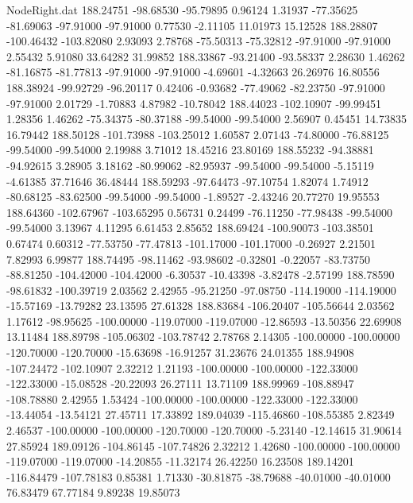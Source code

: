 \begin{filecontents}{NodeRight.dat}
 188.24751  -98.68530  -95.79895     0.96124    1.31937  -77.35625  -81.69063  -97.91000  -97.91000    0.77530   -2.11105   11.01973   15.12528
 188.28807 -100.46432 -103.82080     2.93093    2.78768  -75.50313  -75.32812  -97.91000  -97.91000    2.55432    5.91080   33.64282   31.99852
 188.33867  -93.21400  -93.58337     2.28630    1.46262  -81.16875  -81.77813  -97.91000  -97.91000   -4.69601   -4.32663   26.26976   16.80556
 188.38924  -99.92729  -96.20117     0.42406   -0.93682  -77.49062  -82.23750  -97.91000  -97.91000    2.01729   -1.70883    4.87982  -10.78042
 188.44023 -102.10907  -99.99451     1.28356    1.46262  -75.34375  -80.37188  -99.54000  -99.54000    2.56907    0.45451   14.73835   16.79442
 188.50128 -101.73988 -103.25012     1.60587    2.07143  -74.80000  -76.88125  -99.54000  -99.54000    2.19988    3.71012   18.45216   23.80169
 188.55232  -94.38881  -94.92615     3.28905    3.18162  -80.99062  -82.95937  -99.54000  -99.54000   -5.15119   -4.61385   37.71646   36.48444
 188.59293  -97.64473  -97.10754     1.82074    1.74912  -80.68125  -83.62500  -99.54000  -99.54000   -1.89527   -2.43246   20.77270   19.95553
 188.64360 -102.67967 -103.65295     0.56731    0.24499  -76.11250  -77.98438  -99.54000  -99.54000    3.13967    4.11295    6.61453    2.85652
 188.69424 -100.90073 -103.38501     0.67474    0.60312  -77.53750  -77.47813 -101.17000 -101.17000   -0.26927    2.21501    7.82993    6.99877
 188.74495  -98.11462  -93.98602    -0.32801   -0.22057  -83.73750  -88.81250 -104.42000 -104.42000   -6.30537  -10.43398   -3.82478   -2.57199
 188.78590  -98.61832 -100.39719     2.03562    2.42955  -95.21250  -97.08750 -114.19000 -114.19000  -15.57169  -13.79282   23.13595   27.61328
 188.83684 -106.20407 -105.56644     2.03562    1.17612  -98.95625 -100.00000 -119.07000 -119.07000  -12.86593  -13.50356   22.69908   13.11484
 188.89798 -105.06302 -103.78742     2.78768    2.14305 -100.00000 -100.00000 -120.70000 -120.70000  -15.63698  -16.91257   31.23676   24.01355
 188.94908 -107.24472 -102.10907     2.32212    1.21193 -100.00000 -100.00000 -122.33000 -122.33000  -15.08528  -20.22093   26.27111   13.71109
 188.99969 -108.88947 -108.78880     2.42955    1.53424 -100.00000 -100.00000 -122.33000 -122.33000  -13.44054  -13.54121   27.45711   17.33892
 189.04039 -115.46860 -108.55385     2.82349    2.46537 -100.00000 -100.00000 -120.70000 -120.70000   -5.23140  -12.14615   31.90614   27.85924
 189.09126 -104.86145 -107.74826     2.32212    1.42680 -100.00000 -100.00000 -119.07000 -119.07000  -14.20855  -11.32174   26.42250   16.23508
 189.14201 -116.84479 -107.78183     0.85381    1.71330  -30.81875  -38.79688  -40.01000  -40.01000   76.83479   67.77184    9.89238   19.85073

\end{filecontents}

